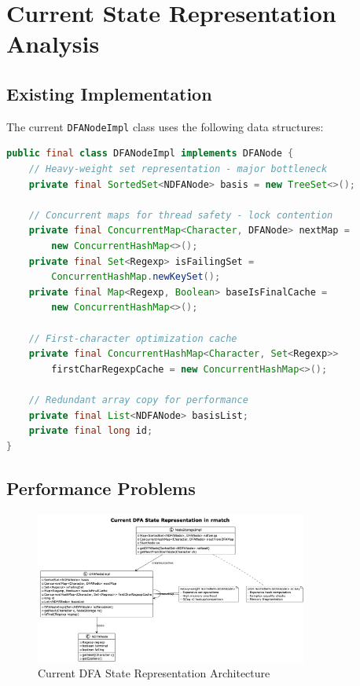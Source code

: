 \documentclass[11pt,a4paper]{article}
\begin{document}
\section{Current State Representation Analysis}

\subsection{Existing Implementation}

The current \texttt{DFANodeImpl} class uses the following data structures:

\begin{lstlisting}[language=Java,caption={Current DFA State Implementation}]
public final class DFANodeImpl implements DFANode {
    // Heavy-weight set representation - major bottleneck
    private final SortedSet<NDFANode> basis = new TreeSet<>();
    
    // Concurrent maps for thread safety - lock contention
    private final ConcurrentMap<Character, DFANode> nextMap = 
        new ConcurrentHashMap<>();
    private final Set<Regexp> isFailingSet = 
        ConcurrentHashMap.newKeySet();
    private final Map<Regexp, Boolean> baseIsFinalCache = 
        new ConcurrentHashMap<>();
    
    // First-character optimization cache
    private final ConcurrentHashMap<Character, Set<Regexp>> 
        firstCharRegexpCache = new ConcurrentHashMap<>();
    
    // Redundant array copy for performance
    private final List<NDFANode> basisList;
    private final long id;
}
\end{lstlisting}

\subsection{Performance Problems}

\begin{figure}[H]
\centering
\includegraphics[width=0.8\textwidth]{illustrations/current_state_representation.png}
\caption{Current DFA State Representation Architecture}
\label{fig:current}
\end{figure}
\end{document}
